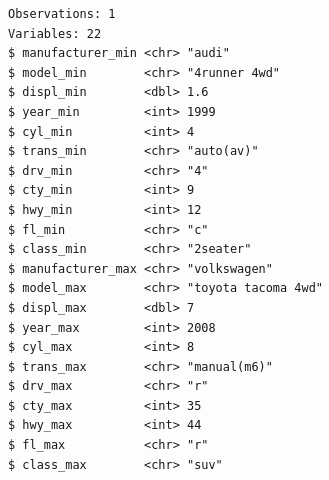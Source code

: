 \documentclass[
  11pt,
]{krantz}
\newenvironment{Shaded}{\begin{snugshade}}{\end{snugshade}}
\newcommand{\CommentTok}[1]{\textcolor[rgb]{0.37,0.37,0.37}{\textit{#1}}}
\newcommand{\DataTypeTok}[1]{\textcolor[rgb]{0.27,0.27,0.27}{#1}}
\newcommand{\KeywordTok}[1]{\textcolor[rgb]{0.27,0.27,0.27}{\textbf{#1}}}
\newcommand{\NormalTok}[1]{#1}
\newcommand{\OperatorTok}[1]{\textcolor[rgb]{0.43,0.43,0.43}{\textbf{#1}}}
\newcommand{\StringTok}[1]{\textcolor[rgb]{0.5,0.5,0.5}{#1}}
\begin{document}
\begin{Shaded}
\end{Shaded}

\begin{verbatim}
Observations: 1
Variables: 22
$ manufacturer_min <chr> "audi"
$ model_min        <chr> "4runner 4wd"
$ displ_min        <dbl> 1.6
$ year_min         <int> 1999
$ cyl_min          <int> 4
$ trans_min        <chr> "auto(av)"
$ drv_min          <chr> "4"
$ cty_min          <int> 9
$ hwy_min          <int> 12
$ fl_min           <chr> "c"
$ class_min        <chr> "2seater"
$ manufacturer_max <chr> "volkswagen"
$ model_max        <chr> "toyota tacoma 4wd"
$ displ_max        <dbl> 7
$ year_max         <int> 2008
$ cyl_max          <int> 8
$ trans_max        <chr> "manual(m6)"
$ drv_max          <chr> "r"
$ cty_max          <int> 35
$ hwy_max          <int> 44
$ fl_max           <chr> "r"
$ class_max        <chr> "suv"
\end{verbatim}

\begin{Shaded}
\end{Shaded}
\end{document}
